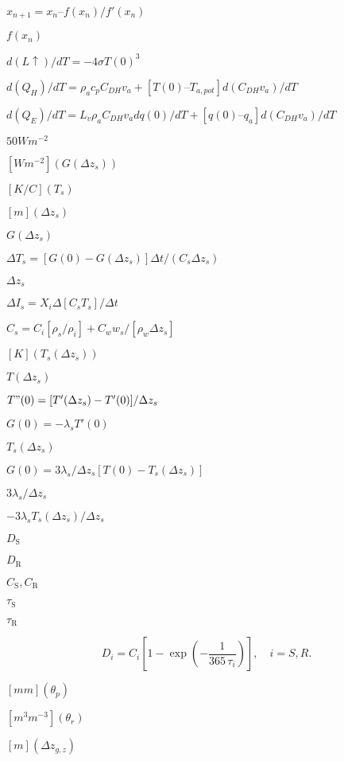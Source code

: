 \documentclass{article}
\begin{document}
{$x_{n+1} = x_n – f(x_n)/f'(x_n)$
\pagebreak

$f(x_n)$
\pagebreak

$d( L \uparrow )/dT = -4 \sigma T(0)^3$
\pagebreak

$d(Q_H)/dT = \rho_a c_p {C_{DH} v_a + [T(0) – T_{a,pot}] d(C_{DH} v_a)/dT}$
\pagebreak

$d(Q_E)/dT = L_v \rho_a{C_{DH} v_a dq(0)/dT+ [q(0) – q_a] d(C_{DH} v_a)/dT}$
\pagebreak

$50 W m^{-2}$
\pagebreak

$[W m^{-2}] (G(\Delta z_s))$
\pagebreak

$[K/C] (T_s)$
\pagebreak

$[m] (\Delta z_s)$
\pagebreak

$G(\Delta z_s)$
\pagebreak

$\Delta T_s = [G(0) - G(\Delta z_s)] \Delta t /(C_s \Delta z_s)$
\pagebreak

$\Delta z_s$
\pagebreak

$\Delta I_s = X_i \Delta [C_s T_s]/ \Delta t$
\pagebreak

$C_s = C_i [\rho_s /\rho_i] + C_w w_s/[\rho_w \Delta z_s]$
\pagebreak

$[K] (T_s(\Delta z_s))$
\pagebreak

$T(\Delta z_s)$
\pagebreak

$T"(0) = [T'(\Delta z_s) - T'(0)]/ \Delta z_s$
\pagebreak

$G(0) = -\lambda_s T'(0)$
\pagebreak

$T_s(\Delta z_s)$
\pagebreak

$G(0) = 3 \lambda_s / \Delta z_s [T(0) - T_s(\Delta z_s)]$
\pagebreak

$3 \lambda_s / \Delta z_s$
\pagebreak

$-3 \lambda_s T_s(\Delta z_s)/ \Delta z_s$
\pagebreak

$D_\mathrm{S}$
\pagebreak

$D_\mathrm{R}$
\pagebreak

$C_\mathrm{S}, C_\mathrm{R}$
\pagebreak

$\tau_\mathrm{S}$
\pagebreak

$\tau_\mathrm{R}$
\pagebreak

\[ \label{citod} D_{i} = C_{i}\left[1 - \exp\left(-\frac{1}{365\,\tau_{i}}\right)\right],\quad i = S, R.\]
\pagebreak

$[mm] (\theta_p)$
\pagebreak

$[m^3 m^{-3}] (\theta_r)$
\pagebreak

$[m] (\Delta z_{g,z})$
\pagebreak

}
\end{document}
